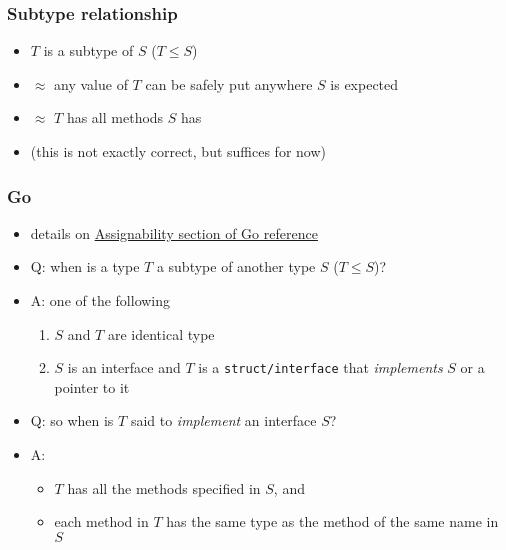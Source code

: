 \documentclass[12pt,dvipdfmx]{beamer}
\begin{document}
\begin{frame}
  \frametitle{Subtype relationship}
  \begin{itemize}
  \item $T$ is a subtype of $S$ ($T \leq S$)
  \item $\approx$
    any value of $T$ can be safely put anywhere $S$ is expected
  \item $\approx$
    $T$ has all methods $S$ has 
  \item (this is not exactly correct, but suffices for now)
  \end{itemize}
\end{frame}

\begin{frame}
  \frametitle{Go}
  \begin{itemize}
  \item details on \href{https://go.dev/ref/spec\#Assignability}{Assignability section of Go reference}
  \item<1-> Q: when is a type $T$ a subtype of another type $S$ ($T \leq S$)?
  \item<2-> A: one of the following
    \begin{enumerate}
    \item $S$ and $T$ are identical type
    \item $S$ is an interface and $T$ is a {\tt struct/interface} that {\it implements} $S$ or a pointer to it
    \end{enumerate}
  \item<3-> Q: so when is $T$ said to {\it implement} an interface $S$?
  \item<4-> A:
    \begin{itemize}
    \item $T$ has all the methods specified in $S$, and 
    \item each method in $T$ has the same type as the method of the same name in $S$
    \end{itemize}
  \end{itemize}
\end{frame}
\end{document}

